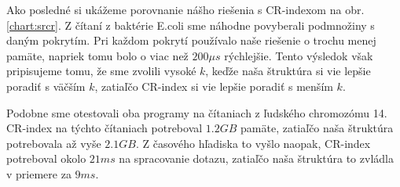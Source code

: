 Ako posledné si ukážeme porovnanie nášho riešenia s CR-indexom na obr. \ref{chart:srcr}.
Z čítaní z baktérie E.coli sme náhodne povyberali podmnožiny s daným pokrytím. Pri každom
pokrytí používalo naše riešenie o trochu menej pamäte, napriek tomu bolo o viac než $200\mu s$
rýchlejšie. Tento výsledok však pripisujeme tomu, že sme zvolili vysoké $k$, keďže naša
štruktúra si vie lepšie poradiť s väčším $k$, zatiaľčo CR-index si vie lepšie poradiť s menším
$k$.

Podobne sme otestovali oba programy na čítaniach z ľudského chromozómu 14. CR-index na týchto čítaniach
potreboval $1.2GB$ pamäte, zatiaľčo naša štruktúra potrebovala až vyše $2.1GB$. Z časového hľadiska
to vyšlo naopak, CR-index potreboval okolo $21ms$ na spracovanie dotazu, zatiaľčo naša štruktúra
to zvládla v priemere za $9ms$.
